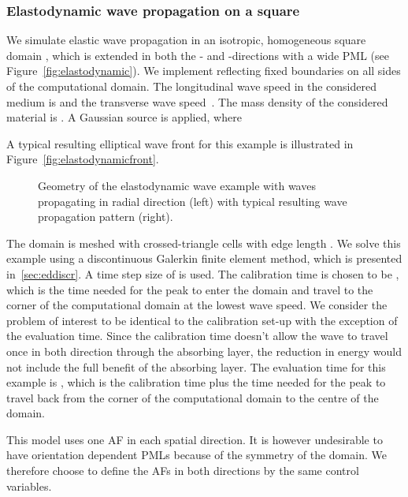 \documentclass[a4paper]{article}
\begin{document}
\subsubsection{Elastodynamic wave propagation on a square}
\label{sec:elastoresultspml}

We simulate elastic wave propagation in an isotropic, homogeneous
square domain , which is
extended in both the - and -directions with a 
wide PML (see Figure~\ref{fig:elastodynamic}). We implement reflecting
fixed boundaries on all sides of the computational domain. The
longitudinal wave speed in the considered medium is  and the transverse wave speed~. The mass density of the considered
material is . A Gaussian source
 is applied, where

A typical resulting elliptical wave front for this example is
illustrated in Figure~\ref{fig:elastodynamicfront}.
\begin{figure}
  \centering
  \hfil
  \caption{Geometry of the elastodynamic wave example with waves
    propagating in radial direction (left) with typical resulting wave
    propagation pattern (right).}
\end{figure}

The domain is meshed with crossed-triangle cells with edge length
. We solve this example using a discontinuous
Galerkin finite element method, which is presented
in~\ref{sec:eddiscr}. A time step size of  is used. The calibration time is chosen to be , which is the time needed for
the peak to enter the domain and travel to the corner of the
computational domain at the lowest wave speed.
We consider the problem of interest to be identical to the calibration set-up
with the exception of the evaluation time. Since the calibration time doesn't
allow the wave to travel once in both direction through the absorbing layer,
the reduction in energy would not include the full benefit of the absorbing
layer. The evaluation time for this example is , which is the calibration time plus
the time needed for the peak to travel back from the corner of the
computational domain to the centre of the domain.

This model uses one AF in each spatial direction. It is however
undesirable to have orientation dependent PMLs because of the symmetry
of the domain. We therefore choose to define the AFs in both
directions by the same control variables.
\end{document}
